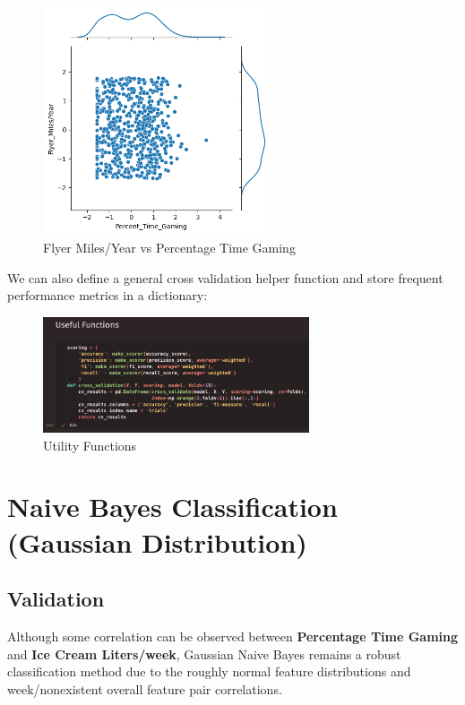\documentclass{article}
\begin{document}
    \begin{figure}[H]
        \centering
        \includegraphics[width=0.6\textwidth, height=0.3\textheight]{pre_d.png}
        \caption{\small{Flyer Miles/Year vs Percentage Time Gaming}}
    \end{figure}

    We can also define a general cross validation helper function and store frequent performance metrics in a dictionary:

    \begin{figure}[H]
        \centering
        \includegraphics[width=0.7\textwidth, height=0.2\textheight]{helper.png}
        \caption{\small{Utility Functions}}
    \end{figure}

    \newpage

\section*{Naive Bayes Classification (Gaussian Distribution)}

    \subsection*{Validation}

    Although some correlation can be observed between \textbf{Percentage Time Gaming} and \textbf{Ice Cream Liters/week},
    Gaussian Naive Bayes remains a robust classification method due to the roughly normal feature distributions
    and week/nonexistent overall feature pair correlations.
\end{document}
